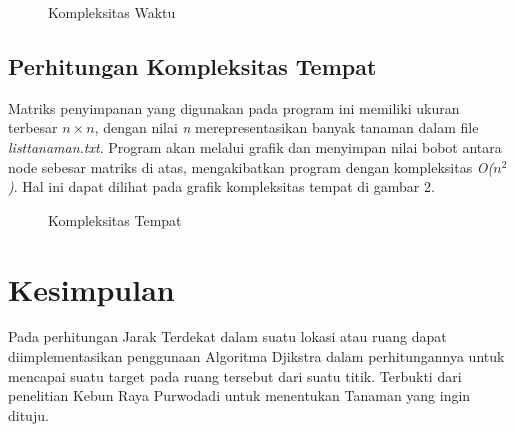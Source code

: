\documentclass[conference]{IEEEtran}
\begin{document}
\begin{figure}[htbp]
	\centering
	\scalebox{0.2}{}
	\caption{Kompleksitas Waktu}
\end{figure} 

\subsection{Perhitungan Kompleksitas Tempat}
Matriks penyimpanan yang digunakan pada program ini memiliki ukuran terbesar $n \times n$, dengan nilai \textit{n} merepresentasikan banyak tanaman dalam ﬁle \textit{listtanaman.txt}. Program akan melalui graﬁk dan menyimpan nilai bobot antara node sebesar matriks di atas, mengakibatkan program dengan kompleksitas \textit{O($n^2$)}. Hal ini dapat dilihat pada graﬁk kompleksitas tempat di gambar 2.
\begin{figure}[htbp]
	\centering
	\scalebox{0.2}{}
	\caption{Kompleksitas Tempat}
\end{figure}

\section{Kesimpulan}
Pada perhitungan Jarak Terdekat dalam suatu lokasi atau ruang dapat diimplementasikan penggunaan Algoritma Djikstra dalam perhitungannya untuk mencapai suatu target pada ruang tersebut dari suatu titik. Terbukti dari penelitian Kebun Raya Purwodadi untuk menentukan Tanaman yang ingin dituju.



\end{document}
